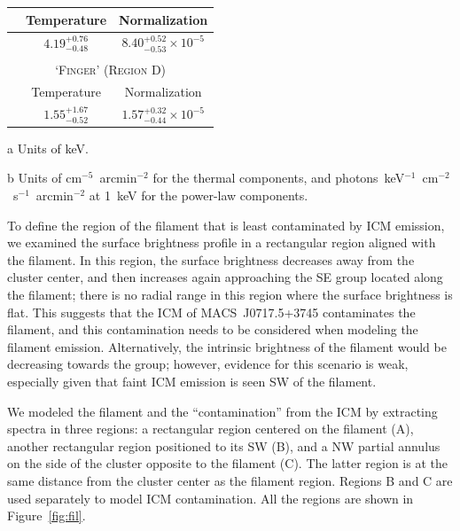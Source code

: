 \documentclass[11pt,a4paper,useAMS,iop]{emulateapj}
\begin{document}
\begin{table}
\begin{center}
\begin{threeparttable}
\begin{tabular}{l c c}
              \hline\hline
                             & Temperature\tnote{a} & Normalization\tnote{b} \\
              \hline
                            & $4.19_{-0.48}^{+0.76}$ & $ 8.40_{-0.53}^{+0.52} \times 10^{-5}$ \\
              \multicolumn{3}{c}{} \\
              \multicolumn{3}{c}{\textsc{ `Finger' (Region D)}} \\
              \hline\hline
                             & Temperature\tnote{a} & Normalization\tnote{b} \\
              \hline
                            & $1.55_{-0.52}^{+1.67}$ & $ 1.57_{-0.44}^{+0.32} \times 10^{-5}$ \\
      \end{tabular}
      \begin{tablenotes}
              \item[a] Units of keV.
              \item[b] Units of cm$^{-5}$~arcmin$^{-2}$ for the thermal components, and photons~keV$^{-1}$~cm$^{-2}$~s$^{-1}$~arcmin$^{-2}$ at 1~keV for the power-law components.
      \end{tablenotes}
    \end{threeparttable}
  \end{center}
\end{table}

To define the region of the filament that is least contaminated by ICM emission, we examined the surface brightness profile in a rectangular region aligned with the filament. In this region, the surface brightness decreases away from the cluster center, and then increases again approaching the SE group located along the filament; there is no radial range in this region where the surface brightness is flat. This suggests that the ICM of MACS~J0717.5+3745 contaminates the filament, and this contamination needs to be considered when modeling the filament emission. Alternatively, the intrinsic brightness of the filament would be decreasing towards the group; however, evidence for this scenario is weak, especially given that faint ICM emission is seen SW of the filament.

We modeled the filament and the ``contamination'' from the ICM by extracting spectra in three regions: a rectangular region centered on the filament (A), another rectangular region positioned to its SW (B), and a NW partial annulus on the side of the cluster opposite to the filament (C). The latter region is at the same distance from the cluster center as the filament region. Regions B and C are used separately to model ICM contamination. All the regions are shown in Figure~\ref{fig:fil}. 
\end{document}
